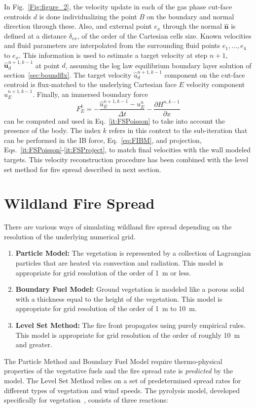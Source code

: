 \documentclass[journal,article,atmosphere,submit,moreauthors,pdftex]{Definitions/mdpi}
\begin{document}
In Fig.~\ref{Fig:figure_2}, the velocity update in each of the gas phase cut-face centroids $d$ is done individualizing the point $B$ on the boundary and normal direction through these. Also, and external point $e_x$ through the normal $\mathbf{\hat{n}}$ is defined at a distance $\delta_{ex}$, of the order of the Cartesian cells size. Known velocities and fluid parameters are interpolated from the surrounding fluid points $e_1,\dots,e_4$ to $e_x$.
This information is used to estimate a target velocity at step $n+1$, $\mathbf{\hat{u}}_d^{n+1,k-1}$ at point $d$, assuming the log law equilibrium boundary layer solution of section~\ref{sec:boundflx}. The target velocity $\hat{u}_d^{n+1,k-1}$ component on the cut-face centroid is flux-matched to the underlying Cartesian face $E$ velocity component $\hat{u}_E^{n+1,k-1}$. Finally, an immersed boundary force
\begin{equation}
F_E^k=-\frac{\hat{u}_E^{n+1,k-1}-u_E^{n}}{\Delta t} - \frac{\partial H^{n,k-1}}{\partial x}
\label{eq:FIBM}
\end{equation}
can be computed and used in Eq.~\eqref{it:FSPoisson} to take into account the presence of the body. The index $k$ refers in this context to the sub-iteration that can be performed in the IB force, Eq.~\eqref{eq:FIBM}, and projection, Eqs.~\eqref{it:FSPoisson}-\eqref{it:FSProject}, to match final velocities with the wall modeled targets. This velocity reconstruction procedure has been combined with the level set method for fire spread described in next section.


\section{Wildland Fire Spread} \label{sec:firespread}

There are various ways of simulating wildland fire spread depending on the resolution of the underlying numerical grid. 
\begin{enumerate}
\item {\bf Particle Model:} The vegetation is represented by a collection of Lagrangian particles that are heated via convection and radiation. This model is appropriate for grid resolution of the order of 1~m or less.
\item {\bf Boundary Fuel Model:} Ground vegetation is modeled like a porous solid with a thickness equal to the height of the vegetation. This model is appropriate for grid resolution of the order of 1~m to 10~m.
\item {\bf Level Set Method:} The fire front propagates using purely empirical rules. This model is appropriate for grid resolution of the order of roughly 10~m and greater. 
\end{enumerate}
The Particle Method and Boundary Fuel Model require thermo-physical properties of the vegetative fuels and the fire spread rate is {\em predicted} by the model. The Level Set Method relies on a set of predetermined spread rates for different types of vegetation and wind speeds. The pyrolysis model, developed specifically for vegetation~\cite{Porterie:2006,Morvan:CF2004,Houssami:2016}, consists of three reactions:
\end{document}
